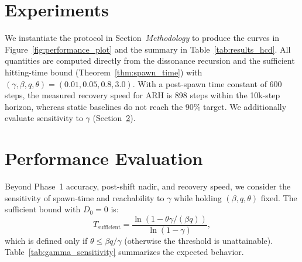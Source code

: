 \documentclass{article}
\numberwithin{figure}{section}
\numberwithin{table}{section}
\numberwithin{algorithm}{section}
\begin{document}
\section{Experiments}
We instantiate the protocol in Section~\textit{Methodology} to produce the curves in Figure~\ref{fig:performance_plot} and the summary in Table~\ref{tab:results_hcd}. All quantities are computed directly from the dissonance recursion and the sufficient hitting-time bound (Theorem~\ref{thm:spawn_time}) with $(\gamma,\beta,q,\theta)=(0.01,0.05,0.8,3.0)$. With a post-spawn time constant of 600 steps, the measured recovery speed for ARH is 898 steps within the 10k-step horizon, whereas static baselines do not reach the 90\% target. We additionally evaluate sensitivity to $\gamma$ (Section~\ref{sec:performance_evaluation}).

\section{Performance Evaluation}
\label{sec:performance_evaluation}
Beyond Phase~1 accuracy, post-shift nadir, and recovery speed, we consider the sensitivity of spawn-time and reachability to $\gamma$ while holding $(\beta,q,\theta)$ fixed. The sufficient bound with $D_0=0$ is:
\[
T_{\mathrm{sufficient}} = \frac{\ln\!\left(1 - \theta \gamma / (\beta q)\right)}{\ln(1-\gamma)},
\]
which is defined only if $\theta \le \beta q / \gamma$ (otherwise the threshold is unattainable). Table~\ref{tab:gamma_sensitivity} summarizes the expected behavior.

\begin{table}[h]
\centering
\caption{Analytical sensitivity of $T_{\mathrm{sufficient}}$ to the decay rate $\gamma$ with $\beta=0.05$, $q=0.8$, and $\theta=3.0$. When $D_\infty=\beta q/\gamma < \theta$, the threshold is unreachable and no vertical expansion occurs (stable regime).}
\label{tab:gamma_sensitivity}
\end{table}
\end{document}
